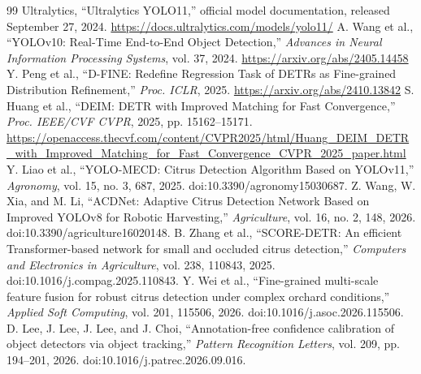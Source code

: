 \documentclass[11pt,a4paper]{article}
\begin{document}
\begin{thebibliography}{99}
 Ultralytics, “Ultralytics YOLO11,” official model documentation, released September 27, 2024. \url{https://docs.ultralytics.com/models/yolo11/}
 A. Wang et al., “YOLOv10: Real-Time End-to-End Object Detection,” \emph{Advances in Neural Information Processing Systems}, vol. 37, 2024. \url{https://arxiv.org/abs/2405.14458}
 Y. Peng et al., “D-FINE: Redefine Regression Task of DETRs as Fine-grained Distribution Refinement,” \emph{Proc. ICLR}, 2025. \url{https://arxiv.org/abs/2410.13842}
 S. Huang et al., “DEIM: DETR with Improved Matching for Fast Convergence,” \emph{Proc. IEEE/CVF CVPR}, 2025, pp. 15162--15171. \url{https://openaccess.thecvf.com/content/CVPR2025/html/Huang_DEIM_DETR_with_Improved_Matching_for_Fast_Convergence_CVPR_2025_paper.html}
 Y. Liao et al., “YOLO-MECD: Citrus Detection Algorithm Based on YOLOv11,” \emph{Agronomy}, vol. 15, no. 3, 687, 2025. doi:10.3390/agronomy15030687.
 Z. Wang, W. Xia, and M. Li, “ACDNet: Adaptive Citrus Detection Network Based on Improved YOLOv8 for Robotic Harvesting,” \emph{Agriculture}, vol. 16, no. 2, 148, 2026. doi:10.3390/agriculture16020148.
 B. Zhang et al., “SCORE-DETR: An efficient Transformer-based network for small and occluded citrus detection,” \emph{Computers and Electronics in Agriculture}, vol. 238, 110843, 2025. doi:10.1016/j.compag.2025.110843.
 Y. Wei et al., “Fine-grained multi-scale feature fusion for robust citrus detection under complex orchard conditions,” \emph{Applied Soft Computing}, vol. 201, 115506, 2026. doi:10.1016/j.asoc.2026.115506.
 D. Lee, J. Lee, J. Lee, and J. Choi, “Annotation-free confidence calibration of object detectors via object tracking,” \emph{Pattern Recognition Letters}, vol. 209, pp. 194--201, 2026. doi:10.1016/j.patrec.2026.09.016.
\end{thebibliography}
\end{document}
